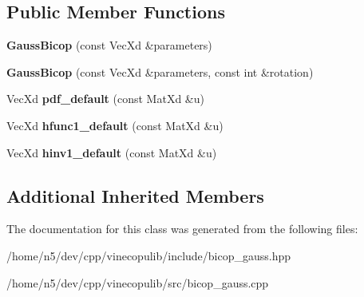 \subsection*{Public Member Functions}
\begin{DoxyCompactItemize}
\item 
{\bfseries Gauss\+Bicop} (const Vec\+Xd \&parameters)\hypertarget{class_gauss_bicop_a7701b11601e7d9cb0c49aa449440924e}{}\label{class_gauss_bicop_a7701b11601e7d9cb0c49aa449440924e}

\item 
{\bfseries Gauss\+Bicop} (const Vec\+Xd \&parameters, const int \&rotation)\hypertarget{class_gauss_bicop_aa3ca70729cc7f4b027dc660cf47bf908}{}\label{class_gauss_bicop_aa3ca70729cc7f4b027dc660cf47bf908}

\item 
Vec\+Xd {\bfseries pdf\+\_\+default} (const Mat\+Xd \&u)\hypertarget{class_gauss_bicop_ae12c6e56243c6f2d2878fa403f2ccb91}{}\label{class_gauss_bicop_ae12c6e56243c6f2d2878fa403f2ccb91}

\item 
Vec\+Xd {\bfseries hfunc1\+\_\+default} (const Mat\+Xd \&u)\hypertarget{class_gauss_bicop_a9a6e04b749c34920cc8c981dd8114c2b}{}\label{class_gauss_bicop_a9a6e04b749c34920cc8c981dd8114c2b}

\item 
Vec\+Xd {\bfseries hinv1\+\_\+default} (const Mat\+Xd \&u)\hypertarget{class_gauss_bicop_a298263b90ef2ab40190d4fe00bd9196c}{}\label{class_gauss_bicop_a298263b90ef2ab40190d4fe00bd9196c}

\end{DoxyCompactItemize}
\subsection*{Additional Inherited Members}


The documentation for this class was generated from the following files\+:\begin{DoxyCompactItemize}
\item 
/home/n5/dev/cpp/vinecopulib/include/bicop\+\_\+gauss.\+hpp\item 
/home/n5/dev/cpp/vinecopulib/src/bicop\+\_\+gauss.\+cpp\end{DoxyCompactItemize}

